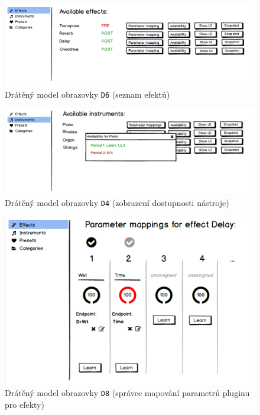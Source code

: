 \documentclass[thesis=M,czech]{FITthesis}[2019/03/06]
\begin{document}
		\begin{figure}
			\centering
			\includegraphics[width=1\textwidth]{DesktopUI-EffectList}
			\caption{Drátěný model obrazovky \texttt{D6} (seznam efektů)}\label{fig:DesktopUI-EffectList}
		\end{figure}
		\begin{figure}
			\centering
			\includegraphics[width=1\textwidth]{DesktopUI-InstrumentAvailability}
			\caption{Drátěný model obrazovky \texttt{D4} (zobrazení dostupnosti nástroje)}\label{fig:DesktopUI-InstrumentAvailability}
		\end{figure}
		\begin{figure}
			\centering
			\includegraphics[width=1\textwidth]{DesktopUI-EffectParamMapping}
			\caption{Drátěný model obrazovky \texttt{D8} (správce mapování parametrů pluginu pro efekty)}\label{fig:DesktopUI-EffectParamMapping}
		\end{figure}
\end{document}
